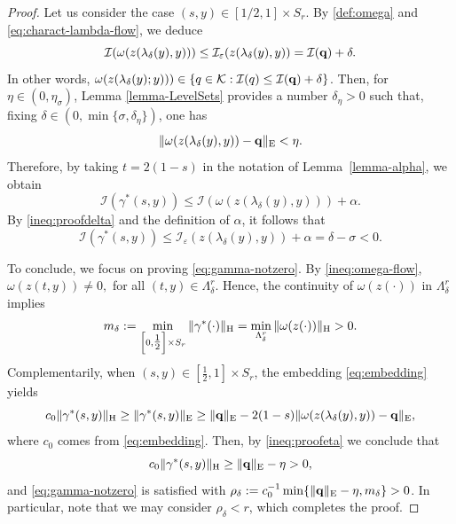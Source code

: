 \documentclass{article}
\newcommand{\boK}{\mathcal{K}}
\newcommand{\boI}{\mathcal{I}}
\newcommand{\Hilb}{{\textnormal H}}
\newcommand{\Ebanach}{{\textnormal E}}
\newcommand{\minq}{{\bf q}}
\theoremstyle{definition}
\begin{document}
\begin{proof}
Let us consider the case $(s,y)\in[1/2,1]\times S_r$. By \eqref{def:omega} and \eqref{eq:charact-lambda-flow}, we deduce
\begin{equation}\label{ineq:proofdelta}
    \boI(\omega(z(\lambda_\delta(y),y)))\leq\boI_\varepsilon(z(\lambda_\delta(y),y))=\boI(\minq)+\delta.
\end{equation}
In other words, $\omega(z(\lambda_\delta(y);y)))\in \{q\in\boK: \boI(q)\leq \boI(\minq)+\delta\}$. Then, for $\eta\in (0,\eta_\sigma)$, Lemma \ref{lemma-LevelSets} provides a number $\delta_\eta>0$ such that, fixing $\delta\in (0,\min\{\sigma,\delta_\eta\})$, one has
\begin{equation}\label{ineq:proofeta}
    \|\omega(z(\lambda_\delta(y),y))-\minq\|_\Ebanach<\eta.
\end{equation}Therefore, by taking $t=2(1-s)$ in the notation of Lemma~\ref{lemma-alpha}, we obtain
\begin{equation}\label{ineq:gamma*-negative}
    \boI(\gamma^*(s,y))\leq\boI(\omega(z(\lambda_\delta(y),y)))+\alpha.
\end{equation}
By \eqref{ineq:proofdelta} and the definition of $\alpha$, it follows that
\begin{equation}\label{ineq:gamma*-negative2}
    \boI(\gamma^*(s,y))\leq\boI_\varepsilon(z(\lambda_\delta(y),y))+\alpha=\delta-\sigma<0.
\end{equation}

To conclude, we focus on proving \eqref{eq:gamma-notzero}. By \eqref{ineq:omega-flow}, $
	\omega(z(t,y))\neq0,$ for all $(t,y)\in\Lambda_\delta^r.$ Hence, the continuity of $\omega(z(\cdot))$ in $\Lambda_\delta^r$ implies
\begin{equation}\label{eq:gamma*-positive1}
    m_\delta:=\min_{\left[0,\tfrac{1}{2}\right]\times S_r
}\|\gamma^*(\cdot)\|_\Hilb= \min_{\Lambda_\delta^r}\|\omega(z(\cdot))\|_\Hilb>0.
\end{equation}
Complementarily, when $(s,y)\in\left[\tfrac{1}{2},1\right]\times S_r$, the embedding \eqref{eq:embedding} yields
\begin{equation}
    c_0\|\gamma^*(s,y)\|_\Hilb\geq\|\gamma^*(s,y)\|_{\textnormal E}\geq\|\minq\|_{\textnormal E}-2(1-s)\|\omega(z(\lambda_\delta(y),y))-\minq\|_{\textnormal E},
\end{equation}
where $c_0$ comes from \eqref{eq:embedding}. Then, by \eqref{ineq:proofeta} we conclude that
\begin{equation}\label{eq:gamma*-positive2}
    c_0\|\gamma^*(s,y)\|_\Hilb\geq\|\minq\|_{\textnormal E}-\eta>0,
\end{equation}
and \eqref{eq:gamma-notzero} is satisfied with $\rho_\delta:=c_0^{-1}\min\{\|\minq\|_{\textnormal E}-\eta,m_\delta\}>0$. In particular, note that we may consider $\rho_\delta<r$, which completes the proof.
\end{proof}
\end{document}

